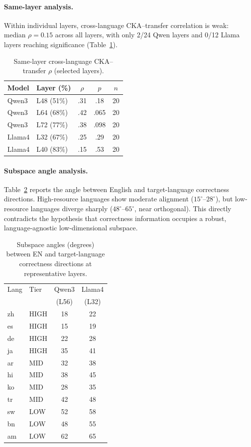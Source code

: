 \documentclass[11pt,a4paper]{article}
\begin{document}
\paragraph{Same-layer analysis.}
Within individual layers, cross-language CKA--transfer correlation is weak: median $\rho = 0.15$ across all layers, with only 2/24 Qwen layers and 0/12 Llama layers reaching significance (Table~\ref{tab:same_layer_cka}).

\begin{table}[t]
\centering
\small
\caption{Same-layer cross-language CKA--transfer $\rho$ (selected layers).}
\label{tab:same_layer_cka}
\begin{tabular}{llccc}
\toprule
Model & Layer (\%) & $\rho$ & $p$ & $n$ \\
\midrule
Qwen3 & L48 (51\%) & .31 & .18 & 20 \\
Qwen3 & L64 (68\%) & .42 & .065 & 20 \\
Qwen3 & L72 (77\%) & .38 & .098 & 20 \\
Llama4 & L32 (67\%) & .25 & .29 & 20 \\
Llama4 & L40 (83\%) & .15 & .53 & 20 \\
\bottomrule
\end{tabular}
\end{table}

\paragraph{Subspace angle analysis.}
Table~\ref{tab:subspace_angles} reports the angle between English and target-language correctness directions.
High-resource languages show moderate alignment ($15^\circ$--$28^\circ$), but low-resource languages diverge sharply ($48^\circ$--$65^\circ$, near orthogonal).
This directly contradicts the hypothesis that correctness information occupies a robust, language-agnostic low-dimensional subspace.

\begin{table}[t]
\centering
\small
\caption{Subspace angles (degrees) between EN and target-language correctness directions at representative layers.}
\label{tab:subspace_angles}
\begin{tabular}{llcc}
\toprule
Lang & Tier & Qwen3 & Llama4 \\
     &      & (L56)  & (L32) \\
\midrule
zh & HIGH & 18 & 22 \\
es & HIGH & 15 & 19 \\
de & HIGH & 22 & 28 \\
ja & HIGH & 35 & 41 \\
\midrule
ar & MID & 32 & 38 \\
hi & MID & 38 & 45 \\
ko & MID & 28 & 35 \\
tr & MID & 42 & 48 \\
\midrule
sw & LOW & 52 & 58 \\
bn & LOW & 48 & 55 \\
am & LOW & 62 & 65 \\
\bottomrule
\end{tabular}
\end{table}
\end{document}
